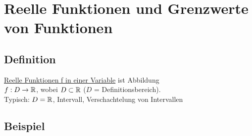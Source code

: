 \section[Funktionen und Grenzwerte]{Reelle Funktionen und Grenzwerte von Funktionen}
\subsection{Definition}
\underline{Reelle Funktionen f in einer Variable} ist Abbildung\\
$ f : D \rightarrow \mathbb{R}$, wobei $D \subset \mathbb{R} $ ($D$ = Definitionsbereich).\\
Typisch: $ D = \mathbb{R}$, Intervall, Verschachtelung von Intervallen
\subsection{Beispiel}
